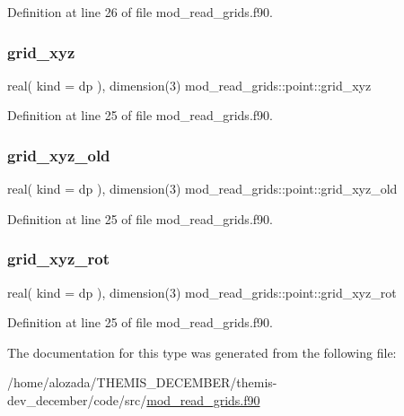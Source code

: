 Definition at line 26 of file mod\+\_\+read\+\_\+grids.\+f90.

\mbox{\label{structmod__read__grids_1_1point_a44e07983c85907248f16a1d5409902a8}} 
\subsubsection{\texorpdfstring{grid\+\_\+xyz}{grid\_xyz}}
{\footnotesize\ttfamily real( kind = dp ), dimension(3) mod\+\_\+read\+\_\+grids\+::point\+::grid\+\_\+xyz}



Definition at line 25 of file mod\+\_\+read\+\_\+grids.\+f90.

\mbox{\label{structmod__read__grids_1_1point_a010b9b432e70f8114e6ba80806abc995}} 
\subsubsection{\texorpdfstring{grid\+\_\+xyz\+\_\+old}{grid\_xyz\_old}}
{\footnotesize\ttfamily real( kind = dp ), dimension(3) mod\+\_\+read\+\_\+grids\+::point\+::grid\+\_\+xyz\+\_\+old}



Definition at line 25 of file mod\+\_\+read\+\_\+grids.\+f90.

\mbox{\label{structmod__read__grids_1_1point_ab0f3d5d60468a83f53e8f09bda7b17b3}} 
\subsubsection{\texorpdfstring{grid\+\_\+xyz\+\_\+rot}{grid\_xyz\_rot}}
{\footnotesize\ttfamily real( kind = dp ), dimension(3) mod\+\_\+read\+\_\+grids\+::point\+::grid\+\_\+xyz\+\_\+rot}



Definition at line 25 of file mod\+\_\+read\+\_\+grids.\+f90.



The documentation for this type was generated from the following file\+:\begin{DoxyCompactItemize}
\item 
/home/alozada/\+T\+H\+E\+M\+I\+S\+\_\+\+D\+E\+C\+E\+M\+B\+E\+R/themis-\/dev\+\_\+december/code/src/\hyperlink{mod__read__grids_8f90}{mod\+\_\+read\+\_\+grids.\+f90}\end{DoxyCompactItemize}
